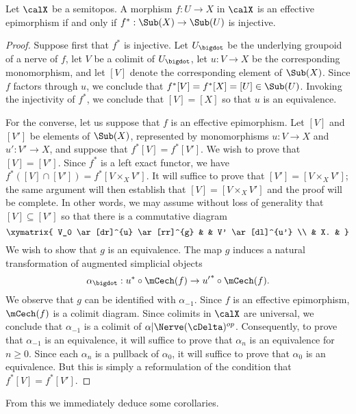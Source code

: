 \begin{proposition}\label{charsurj}
Let $\calX$ be a semitopos.
A morphism $f: U \rightarrow X$ in $\calX$ is an effective epimorphism if and
only if $f^{\ast}: \Sub(X) \rightarrow \Sub(U)$ is injective.
\end{proposition}

\begin{proof}
Suppose first that $f^{\ast}$ is injective. Let $U_{\bigdot}$
be the underlying groupoid of a \Cech nerve of $f$, let
$V$ be a colimit of $U_{\bigdot}$, let $u: V \rightarrow X$
be the corresponding monomorphism, and let $[V]$ denote the corresponding element
of $\Sub(X)$. Since $f$ factors through $u$, we conclude that $f^{\ast}[V] = f^{\ast} [X] = [U] \in \Sub(U)$. Invoking the injectivity of $f^{\ast}$, we conclude that $[V] = [X]$ so that $u$ is an equivalence.

For the converse, let us suppose that $f$ is an effective epimorphism.
Let $[V]$ and $[V']$ be elements of $\Sub(X)$, represented by monomorphisms
$u: V \rightarrow X$ and $u': V' \rightarrow X$, and suppose that
$f^{\ast} [V] = f^{\ast} [V']$. We wish to prove that $[V] = [V']$. 
Since $f^{\ast}$ is a left exact functor, we have
$f^{\ast}( [V] \cap [V'] ) = f^{\ast} [ V \times_{X} V' ]$. It will suffice
to prove that $[V'] = [V \times_{X} V']$; the same argument will then establish
that $[V] = [V \times_{X} V']$ and the proof will be complete. In other words, we may assume without loss of generality that $[V] \subseteq [V']$ so that there is a commutative diagram
$$ \xymatrix{ V_0 \ar[dr]^{u} \ar[rr]^{g} & & V' \ar[dl]^{u'} \\
& X. & }$$
We wish to show that $g$ is an equivalence. The map $g$ induces
a natural transformation of augmented simplicial objects
$$ \alpha_{\bigdot}: u^{\ast} \circ \mCech(f) \rightarrow {u'}^{\ast} \circ \mCech(f).$$
We observe that $g$ can be identified with $\alpha_{-1}$. Since
$f$ is an effective epimorphism, $\mCech(f)$ is a colimit diagram.
Since colimits in $\calX$ are universal, we conclude that
$\alpha_{-1}$ is a colimit of $\alpha | \Nerve(\cDelta)^{op}$. Consequently, to
prove that $\alpha_{-1}$ is an equivalence, it will suffice to prove that $\alpha_n$
is an equivalence for $n \geq 0$. Since each $\alpha_n$ is a pullback of $\alpha_0$, it will
suffice to prove that $\alpha_0$ is an equivalence. But this is simply a reformulation
of the condition that $f^{\ast} [V] = f^{\ast} [V']$.
\end{proof}

From this we immediately deduce some corollaries.

